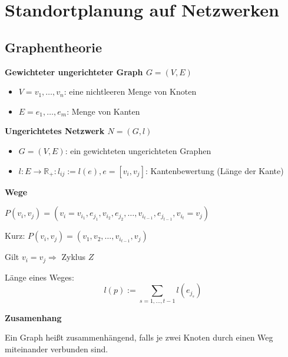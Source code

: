 \chapter{Standortplanung auf Netzwerken} %
\label{cha:standortplanung_auf_netzwerken}

  \label{sec:standortplanung_auf_netzwerken}

  \section{Graphentheorie} %
  \label{sec:graphentheorie}

    \par \textbf{Gewichteter ungerichteter Graph $G = (V, E)$}
    \begin{itemize}
        \item $V = {v_1, \dots, v_n}$: eine nichtleeren Menge von Knoten  
        \item $E = {e_1, \dots, e_m}$: Menge von Kanten
      \end{itemize}  

    \par \textbf{Ungerichtetes Netzwerk $N = (G, l)$}
    \begin{itemize}
      \item $G = (V, E)$: ein gewichteten ungerichteten Graphen
      \item $l:E \rightarrow \mathbb{R}_+: l_{ij} := l(e), e= [v_i, v_j]$: Kantenbewertung (Länge der Kante)
    \end{itemize}

    \par \textbf{Wege}

    $P(v_i, v_j) = (v_i = v_{i_1}, e_{j_1},v_{i_2}, e_{j_2}, \dots, v_{i_{t - 1}}, e_{j_{t-1}}, v_{i_t} = v_j)$

    \par Kurz: $P(v_i, v_j) = (v_1, v_2, \dots, v_{i_{t-1}}, v_j)$

    \par Gilt $v_i = v_j \Rightarrow$ Zyklus $Z$ 

    \par Länge eines Weges: 
    \[
      l(p):= \sum_{s = 1, \dots, t-1}l(e_{j_s})
    \]

    \par \textbf{Zusamenhang}

    \par Ein Graph heißt zusammenhängend, falls je zwei Knoten durch einen Weg miteinander verbunden sind.

